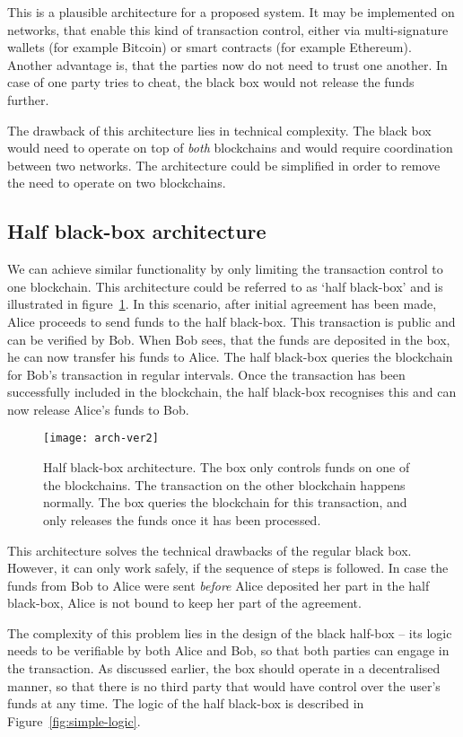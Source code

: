 This is a plausible architecture for a proposed system. It may be implemented on networks, that enable this kind of transaction control, either via multi-signature wallets (for example Bitcoin) or smart contracts (for example Ethereum). Another advantage is, that the parties now do not need to trust one another. In case of one party tries to cheat, the black box would not release the funds further.

The drawback of this architecture lies in technical complexity. The black box would need to operate on top of \textit{both} blockchains and would require coordination between two networks. The architecture could be simplified in order to remove the need to operate on two blockchains.

\subsection{Half black-box architecture}
We can achieve similar functionality by only limiting the transaction control to one blockchain. This architecture could be referred to as `half black-box' and is illustrated in figure~\ref{fig:arch-ver2}. In this scenario, after initial agreement has been made, Alice proceeds to send funds to the half black-box. This transaction is public and can be verified by Bob. When Bob sees, that the funds are deposited in the box, he can now transfer his funds to Alice. The half black-box queries the blockchain for Bob's transaction in regular intervals. Once the transaction has been successfully included in the blockchain, the half black-box recognises this and can now release Alice's funds to Bob.
% 
\begin{figure}[ht]
    \centering
    \texttt{[image: arch-ver2]}
    \caption{Half black-box architecture. The box only controls funds on one of the blockchains. The transaction on the other blockchain happens normally. The box queries the blockchain for this transaction, and only releases the funds once it has been processed.}
    \label{fig:arch-ver2}
\end{figure}

This architecture solves the technical drawbacks of the regular black box. However, it can only work safely, if the sequence of steps is followed. In case the funds from Bob to Alice were sent \textit{before} Alice deposited her part in the half black-box, Alice is not bound to keep her part of the agreement.

The complexity of this problem lies in the design of the black half-box -- its logic needs to be verifiable by both Alice and Bob, so that both parties can engage in the transaction. As discussed earlier, the box should operate in a decentralised manner, so that there is no third party that would have control over the user's funds at any time. The logic of the half black-box is described in Figure~\ref{fig:simple-logic}.

